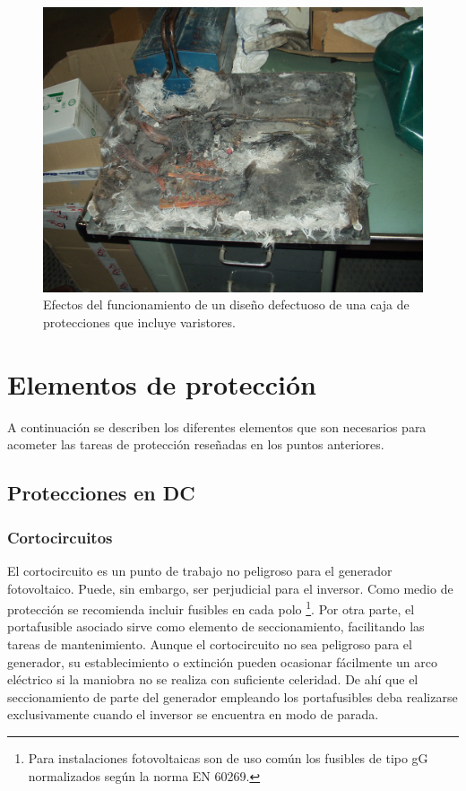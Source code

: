 %
\begin{figure}
\begin{centering}
\includegraphics[scale=0.1]{../figs/CajaForumDestruida}
\end{centering}

\caption{Efectos del funcionamiento de un diseño defectuoso de una caja de
protecciones que incluye varistores.\label{fig:EfectosVaristor}}

\end{figure}



\section{Elementos de protección}

A continuación se describen los diferentes elementos que son necesarios
para acometer las tareas de protección reseñadas en los puntos anteriores.


\subsection{Protecciones en DC}


\subsubsection{Cortocircuitos}

El cortocircuito es un punto de trabajo no peligroso para el generador
fotovoltaico. Puede, sin embargo, ser perjudicial para el inversor.
Como medio de protección se recomienda incluir fusibles en cada polo%
\footnote{Para instalaciones fotovoltaicas son de uso común los fusibles de
tipo gG normalizados según la norma EN 60269.%
}. Por otra parte, el portafusible asociado sirve como elemento de
seccionamiento, facilitando las tareas de mantenimiento. Aunque el
cortocircuito no sea peligroso para el generador, su establecimiento
o extinción pueden ocasionar fácilmente un arco eléctrico si la maniobra
no se realiza con suficiente celeridad. De ahí que el seccionamiento
de parte del generador empleando los portafusibles deba realizarse
exclusivamente cuando el inversor se encuentra en modo de parada. 

